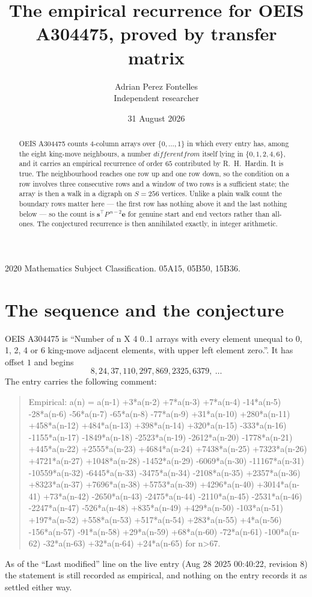 \documentclass[11pt,a4paper]{article}
\title{The empirical recurrence for OEIS A304475, proved by transfer matrix}
\author{Adrian Perez Fontelles\\ \small Independent researcher}
\date{31 August 2026}
\theoremstyle{plain}
\theoremstyle{definition}
\begin{document}
\maketitle

\begin{abstract}
OEIS A304475 counts $4$-column arrays over $\{0,\dots,1\}$ in which every entry has,
among the eight king-move neighbours, a number $different from$ itself lying in $\{0,1,2,4,6\}$, and it carries an empirical
recurrence of order $65$ contributed by R.~H.~Hardin. It is true. The neighbourhood
reaches one row up and one row down, so the condition on a row involves three consecutive
rows and a window of two rows is a sufficient state; the array is then a walk in a digraph
on $S=256$ vertices. Unlike a plain walk count the boundary rows matter here --- the first
row has nothing above it and the last nothing below --- so the count is
$\mathbf{s}^{\!\top}P^{\,n-2}\mathbf{e}$ for genuine start and end vectors rather than
all-ones. The conjectured recurrence is then annihilated exactly, in integer arithmetic.
\end{abstract}

\noindent\small 2020 Mathematics Subject Classification. 05A15, 05B50, 15B36.\normalsize

\section{The sequence and the conjecture}

OEIS A304475 is ``Number of n X 4 0..1 arrays with every element unequal to 0, 1, 2, 4 or 6 king-move adjacent elements, with upper left element zero.''. It has offset
$1$ and begins
\[
8, 24, 37, 110, 297, 869, 2325, 6379,\ \dots
\]
The entry carries the following comment:
\begin{quote}\small
Empirical: a(n) = a(n-1) +3*a(n-2) +7*a(n-3) +7*a(n-4) -14*a(n-5) -28*a(n-6) -56*a(n-7) -65*a(n-8) -77*a(n-9) +31*a(n-10) +280*a(n-11) +458*a(n-12) +484*a(n-13) +398*a(n-14) +320*a(n-15) -333*a(n-16) -1155*a(n-17) -1849*a(n-18) -2523*a(n-19) -2612*a(n-20) -1778*a(n-21) +445*a(n-22) +2555*a(n-23) +4684*a(n-24) +7438*a(n-25) +7323*a(n-26) +4721*a(n-27) +1048*a(n-28) -1452*a(n-29) -6069*a(n-30) -11167*a(n-31) -10559*a(n-32) -6445*a(n-33) -3475*a(n-34) -2108*a(n-35) +2357*a(n-36) +8323*a(n-37) +7696*a(n-38) +5753*a(n-39) +4296*a(n-40) +3014*a(n-41) +73*a(n-42) -2650*a(n-43) -2475*a(n-44) -2110*a(n-45) -2531*a(n-46) -2247*a(n-47) -526*a(n-48) +835*a(n-49) +429*a(n-50) -103*a(n-51) +197*a(n-52) +558*a(n-53) +517*a(n-54) +283*a(n-55) +4*a(n-56) -156*a(n-57) -91*a(n-58) +29*a(n-59) +68*a(n-60) -72*a(n-61) -100*a(n-62) -32*a(n-63) +32*a(n-64) +24*a(n-65) for n>67.
\end{quote}
As of the ``Last modified'' line on the live entry (Aug 28 2025 00:40:22, revision
8) the statement is still recorded as empirical, and nothing on the entry
records it as settled either way.
\end{document}
